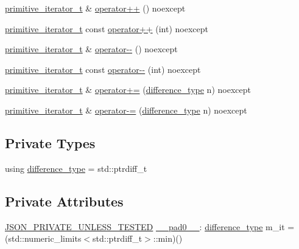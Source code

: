 \begin{DoxyCompactItemize}
\item 
\hyperlink{classnlohmann_1_1detail_1_1primitive__iterator__t}{primitive\+\_\+iterator\+\_\+t} \& \hyperlink{classnlohmann_1_1detail_1_1primitive__iterator__t_ad26511012fc88f3ec5d9e1cb708732fd}{operator++} () noexcept
\item 
\hyperlink{classnlohmann_1_1detail_1_1primitive__iterator__t}{primitive\+\_\+iterator\+\_\+t} const \hyperlink{classnlohmann_1_1detail_1_1primitive__iterator__t_aa011863621357b3cf891670bf63a48b1}{operator++} (int) noexcept
\item 
\hyperlink{classnlohmann_1_1detail_1_1primitive__iterator__t}{primitive\+\_\+iterator\+\_\+t} \& \hyperlink{classnlohmann_1_1detail_1_1primitive__iterator__t_abecbf0c73c7fe963a699738065177bc3}{operator-\/-\/} () noexcept
\item 
\hyperlink{classnlohmann_1_1detail_1_1primitive__iterator__t}{primitive\+\_\+iterator\+\_\+t} const \hyperlink{classnlohmann_1_1detail_1_1primitive__iterator__t_aef3b5dfeb2cb04dc9d0a024fc1898b98}{operator-\/-\/} (int) noexcept
\item 
\hyperlink{classnlohmann_1_1detail_1_1primitive__iterator__t}{primitive\+\_\+iterator\+\_\+t} \& \hyperlink{classnlohmann_1_1detail_1_1primitive__iterator__t_aee01535df0b3b40137d9241029a9a203}{operator+=} (\hyperlink{classnlohmann_1_1detail_1_1primitive__iterator__t_af3db0d5c90de427d51645fe73a015553}{difference\+\_\+type} n) noexcept
\item 
\hyperlink{classnlohmann_1_1detail_1_1primitive__iterator__t}{primitive\+\_\+iterator\+\_\+t} \& \hyperlink{classnlohmann_1_1detail_1_1primitive__iterator__t_a0bf83ab08abe1ae4b51c790c85cdf151}{operator-\/=} (\hyperlink{classnlohmann_1_1detail_1_1primitive__iterator__t_af3db0d5c90de427d51645fe73a015553}{difference\+\_\+type} n) noexcept
\end{DoxyCompactItemize}
\subsection*{Private Types}
\begin{DoxyCompactItemize}
\item 
using \hyperlink{classnlohmann_1_1detail_1_1primitive__iterator__t_af3db0d5c90de427d51645fe73a015553}{difference\+\_\+type} = std\+::ptrdiff\+\_\+t
\end{DoxyCompactItemize}
\subsection*{Private Attributes}
\begin{DoxyCompactItemize}
\item 
\hyperlink{json_8hpp_a2cf645f34610e7f7d6e09ab88a2ab917}{J\+S\+O\+N\+\_\+\+P\+R\+I\+V\+A\+T\+E\+\_\+\+U\+N\+L\+E\+S\+S\+\_\+\+T\+E\+S\+T\+ED} \hyperlink{classnlohmann_1_1detail_1_1primitive__iterator__t_adc7b6ab7810f58afa4d6a5133995c9ba}{\+\_\+\+\_\+pad0\+\_\+\+\_\+}\+: \hyperlink{classnlohmann_1_1detail_1_1primitive__iterator__t_af3db0d5c90de427d51645fe73a015553}{difference\+\_\+type} m\+\_\+it = (std\+::numeric\+\_\+limits$<$std\+::ptrdiff\+\_\+t$>$\+::min)()
\end{DoxyCompactItemize}

